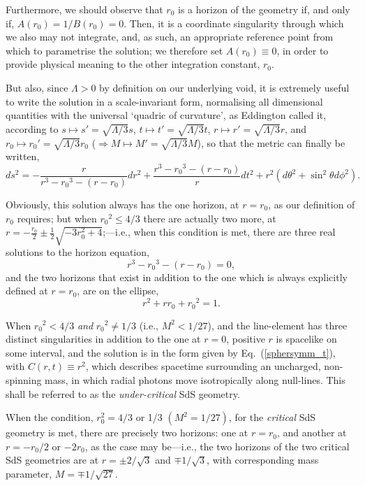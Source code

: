 Furthermore, we should observe that $r_0$ is a horizon of the geometry if, and only if, $A(r_0)=1/B(r_0)=0$. Then, it is a coordinate singularity through which we also may not integrate, and, as such, an appropriate reference point from which to parametrise the solution; we therefore set $A(r_0)\equiv0$, in order to provide physical meaning to the other integration constant, $r_0$. 

But also, since $\Lambda>0$ by definition on our underlying void, it is extremely useful to write the solution in a scale-invariant form, normalising all dimensional quantities with the universal `quadric of curvature', as Eddington called it, according to $s\mapsto{s'}=\sqrt{\Lambda/3}s$, $t\mapsto{t'}=\sqrt{\Lambda/3}t$, $r\mapsto{r'}=\sqrt{\Lambda/3}r$, and $r_0\mapsto{{r_0}'}=\sqrt{\Lambda/3}r_0$ ($\Rightarrow{M}\mapsto{M'}=\sqrt{\Lambda/3}M$), so that the metric can finally be written,
\begin{equation}
ds^2=-\frac{r}{r^3-{r_0}^3-(r-r_0)}dr^2+\frac{r^3-{r_0}^3-(r-r_0)}{r}dt^2+r^2(d\theta^2+\sin^2\theta{d\phi^2}).\label{SdS_statical_pure}
\end{equation}

Obviously, this solution always has the one horizon, at $r=r_0$, as our definition of $r_0$ requires; but when ${r_0}^2\leq4/3$ there are actually two more, at $r=-\frac{r_0}{2}\pm\frac{1}{2}\sqrt{-3r_0^2+4}$;---i.e., when this condition is met, there are three real solutions to the horizon equation, 
\begin{equation}
r^3-{r_0}^3-(r-r_0)=0,\label{horizon_eq}
\end{equation}
and the two horizons that exist in addition to the one which is always explicitly defined at $r=r_0$, are on the ellipse, \begin{equation}
r^2+rr_0+{r_0}^2=1.\label{SdS_ellipse}
\end{equation} 

When ${r_0}^2<4/3$ \textit{and} ${r_0}^2\neq1/3$ (i.e., $M^2<1/27$), and the line-element has three distinct singularities in addition to the one at $r=0$, positive $r$ is spacelike on some interval, and the solution is in the form given by Eq.~(\ref{sphersymm_t}), with $C(r,t)\equiv{r^2}$, which describes spacetime surrounding an uncharged, non-spinning mass, in which radial photons move isotropically along null-lines. This shall be referred to as the \textit{under-critical} SdS geometry.

When the condition, $r_0^2=4/3$ or 1/3 $(M^2=1/27)$, for the \textit{critical} SdS geometry is met, there are precisely two horizons: one at $r=r_0$, and another at $r=-r_0/2$ or $-2r_0$, as the case may be---i.e., the two horizons of the two critical SdS geometries are at ${r}=\pm2/\sqrt{3}$ and $\mp1/\sqrt{3}$, with corresponding mass parameter, $M=\mp1/\sqrt{27}$.

